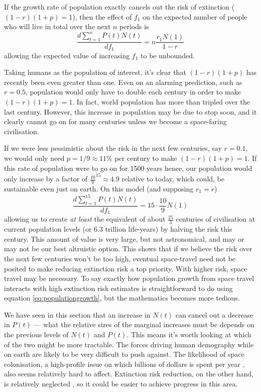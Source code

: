 \documentclass[british]{article}
\begin{document}
If the growth rate of population exactly cancels out the risk of extinction ($(1-r)(1+p) = 1$), then the effect of $f_1$ on the expected number of people who will live in total over the next $n$ periods is  
$$\frac{d\sum_{t=1}^n P(t)N(t)}{df_1} = n\frac{r_1N(1)}{1-r}$$
allowing the expected value of increasing $f_1$ to be unbounded.

Taking humans as the population of interest, it's clear that $(1-r)(1+p)$ has recently been even greater than one. Even on an alarming prediction, such as $r=0.5$, population would only have to double each century in order to make $(1-r)(1+p)=1$. In fact, world population has more than tripled over the last century. However, this increase in population may be due to stop soon, and it clearly cannot go on for many centuries unless we become a space-faring civilisation.

If we were less pessimistic about the risk in the next few centuries, say $r=0.1$, we would only need $p=1/9\approx11\%$ per century to make $(1-r)(1+p)=1$. If this rate of population were to go on for 1500 years hence, our population would only increase by a factor of $\frac{10}{9}^{15} \approx 4.9$ relative to today, which could, be sustainable even just on earth. On this model (and supposing $r_1=r$)
$$\frac{d\sum_{t=1}^{15} P(t)N(t)}{df_1}=15 \cdot \frac{10}{9}N(1)$$
allowing us to create \emph{at least} the equivalent of about $\frac{25}{3}$ centuries of civilisation at current population levels (or 6.3 trillion life-years) by halving the risk this century. This amount of value is very large, but not astronomical, and may or may not be our best altruistic option. This shows that if we believe the risk over the next few centuries won't be too high, eventual space-travel need not be posited to make reducing extinction risk a top priority. With higher risk, space travel may be necessary. To say exactly how population growth from space travel interacts with high extinction risk estimates is straightforward to do using equation \ref{eq:populationgrowth}, but the mathematics becomes more tedious. 

We have seen in this section that an increase in $N(t)$ can cancel out a decrease in $P(t)$ --- what the relative sizes of the marginal increases must be depends on the previous levels of $N(t)$ and $P(t)$. This means it's worth looking at which of the two might be more tractable. The forces driving human demography while on earth are likely to be very difficult to push against. The likelihood of space colonisation, a high-profile issue on which billions of dollars is spent per year \citep{masters_how_2015-1}, also seems relatively hard to affect. Extinction risk reduction, on the other hand, is relatively neglected \citep{bostrom_existential_2013,todd_case_2017}, so it could be easier to achieve progress in this area.
\end{document}
